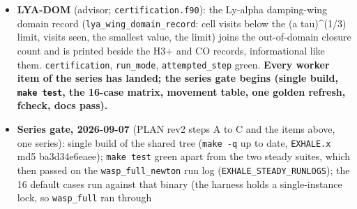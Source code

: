 \documentclass[english,a4paper]{my_memo}
\begin{document}
\begin{itemize}
  digits at the base (4.8e-9 relative), now \texttt{beta\_esc\ +\ beta\_sob\ (1\ -\ beta\_esc)} (closure 2.2e-16). RED before 4.79e2 / GREEN 2.19e-16 on the
  end-to-end identity. \textbf{Impact, \texttt{wasp\_full} to its du stop (2 h 59 m):
  log10 Mdot 13.34 -\textgreater{} 13.34 (+1.6 percent, 0.0067 dex); \texttt{Jint}/\texttt{n\_2p} x84
  at the base, x73 at 1.05, x37 at 1.10, x10 at 1.20, x0.75 at 1.50 R\_p; T
  within 2 percent; the old \texttt{min(1,.)} cap had zeroed the internal field
  from 1.15 R\_p outward.} H(n=2) chord column x31.5 at b = 1.00, x2.8 at
  1.20, x1.005 at 1.45: \textbf{every H-alpha/H-beta transit number in this
  repository from a \texttt{Jlya\ escape-prob:\ True} run is superseded} (He 10830
  not affected). Validity \texttt{(a\ tau)\^{}(1/3)\ \textgreater{}\ 10} holds in 349 of 504 cells,
  out to 1.193 R\_p, exactly where the change is an order of magnitude.
  Advisor follow-ups applied: the second \texttt{A\_2p1s} in \texttt{exhale\_transit\_lib.py}
  and \texttt{docs/transmission\_spectrum.tex} set to 6.2649e8 (one value with the
  wind model), the stale \texttt{E\ =\ min(boost,\ 1/beta)} comment in \texttt{parameters.f90}
  replaced by the implemented \texttt{1\ +\ (boost-1)(1-beta)\ T\_star}. Pending: the
  B6-style print of the Ly-alpha domain record in \texttt{certification.f90} (the
  record and accessor exist; LYA-DOM, with the gate\textquotesingle s follow-ups).
\item
  \textbf{LYA-DOM} (advisor; \texttt{certification.f90}): the Ly-alpha damping-wing
  domain record (\texttt{lya\_wing\_domain\_record}: cell visits below the
  (a tau)\^{}(1/3) limit, visits seen, the smallest value, the limit) joins the
  out-of-domain closure count and is printed beside the H3+ and CO records,
  informational like them. \texttt{certification}, \texttt{run\_mode}, \texttt{attempted\_step}
  green. \textbf{Every worker item of the series has landed; the series gate
  begins (single build, \texttt{make\ test}, the 16-case matrix, movement table,
  one golden refresh, fcheck, docs pass).}
\item
  \textbf{Series gate, 2026-09-07} (PLAN rev2 steps A to C and the items above,
  one series): single build of the shared tree (\texttt{make\ -q} up to date,
  \texttt{EXHALE.x} md5 ba3d34e6eaee); \texttt{make\ test} green apart from the two steady
  suites, which then passed on the \texttt{wasp\_full\_newton} run log
  (\texttt{EXHALE\_STEADY\_RUNLOGS}); the 16 default cases run against that binary
  (the harness holds a single-instance lock, so \texttt{wasp\_full} ran through

\end{itemize}
\end{document}
